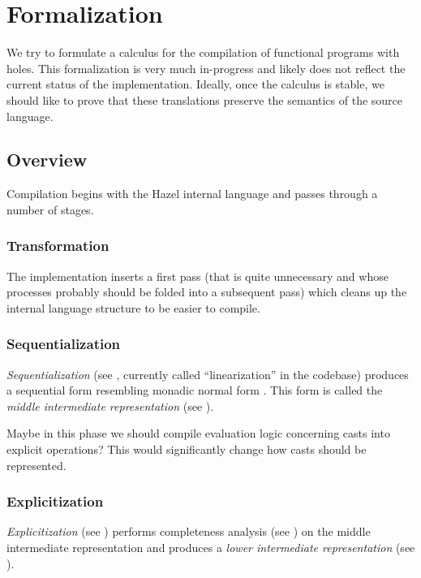 \documentclass[index.tex]{subfiles}
\begin{document}
\section{Formalization}
\label{formalization}
We try to formulate a calculus for the compilation of functional programs with holes. This
formalization is very much in-progress and likely does not reflect the current status of the
implementation. Ideally, once the calculus is stable, we should like to prove that these
translations preserve the semantics of the source language.

\subsection{Overview}
Compilation begins with the Hazel internal language and passes through a number of stages.

\subsubsection{Transformation}
The implementation inserts a first pass (that is quite unnecessary and whose processes probably
should be folded into a subsequent pass) which cleans up the internal language structure to be
easier to compile.

\subsubsection{Sequentialization}
\emph{Sequentialization} (see , currently called ``linearization'' in
the codebase) produces a sequential form resembling monadic normal form \cite{danvy2003}. This form
is called the \emph{middle intermediate representation} (see ).

\begin{thought}
  Maybe in this phase we should compile evaluation logic concerning casts into explicit operations?
  This would significantly change how casts should be represented.
\end{thought}

\subsubsection{Explicitization}
\emph{Explicitization} (see ) performs completeness analysis (see
) on the middle intermediate representation and produces a
\emph{lower intermediate representation} (see ).




\end{document}
